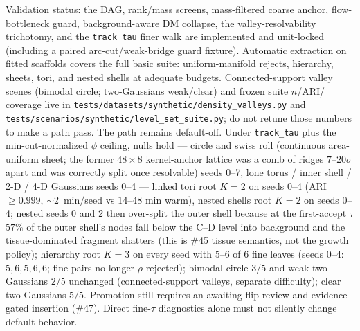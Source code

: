 \documentclass[11pt]{article}
\begin{document}
Validation status: the DAG, rank/mass screens, mass-filtered coarse
anchor, flow-bottleneck guard, background-aware DM collapse, the
valley-resolvability trichotomy, and the \texttt{track\_tau} finer walk
are implemented and unit-locked (including a paired arc-cut/weak-bridge
guard fixture). Automatic extraction on fitted scaffolds covers the
full basic suite: uniform-manifold rejects, hierarchy, sheets, tori,
and nested shells at adequate budgets. Connected-support valley scenes
(bimodal circle; two-Gaussians weak/clear) and frozen suite $n$/ARI/
coverage live in \texttt{tests/datasets/synthetic/density\_valleys.py}
and \texttt{tests/scenarios/synthetic/level\_set\_suite.py}; do not
retune those numbers to make a path pass. The path remains default-off.
Under \texttt{track\_tau} plus the min-cut-normalized $\phi$
ceiling, nulls hold ---
circle and swiss roll (continuous area-uniform sheet; the former
$48\times 8$ kernel-anchor lattice was a comb of ridges $7$--$20\sigma$
apart and was correctly split once resolvable) seeds 0--7, lone torus /
inner shell / 2-D / 4-D Gaussians seeds 0--4 --- linked tori root
$K{=}2$ on seeds 0--4 (ARI $\ge 0.999$, $\sim 2$~min/seed vs $14$--$48$
min warm), nested shells root $K{=}2$ on seeds 0--4; nested seeds 0 and
2 then over-split the outer shell because at the first-accept $\tau$
$57\%$ of the outer shell's nodes fall below the C--D level into
background and the tissue-dominated fragment shatters (this is \#45
tissue semantics, not the growth policy); hierarchy root $K{=}3$ on
every seed with $5$--$6$ of $6$ fine leaves (seeds $0$--$4$:
$5,6,5,6,6$; fine pairs no longer $\rho$-rejected); bimodal circle $3/5$ and weak two-Gaussians
$2/5$ unchanged (connected-support valleys, separate difficulty);
clear two-Gaussians $5/5$.
Promotion still
requires an awaiting-flip review and evidence-gated insertion (\#47).
Direct fine-$\tau$ diagnostics
alone must not silently change default behavior.
\end{document}
